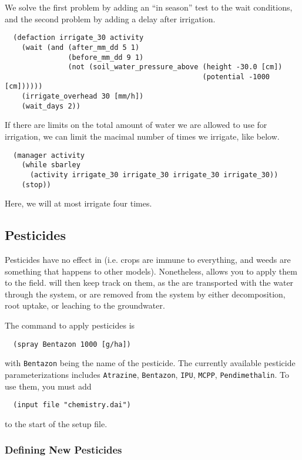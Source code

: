 \documentclass[a4paper,11pt]{article}
\begin{document}
We solve the first problem by adding an ``in season'' test to the wait
conditions, and the second problem by adding a delay after
irrigation. 
\begin{verbatim}
  (defaction irrigate_30 activity 
    (wait (and (after_mm_dd 5 1)
               (before_mm_dd 9 1)
               (not (soil_water_pressure_above (height -30.0 [cm])
                                               (potential -1000 [cm])))))
    (irrigate_overhead 30 [mm/h])
    (wait_days 2))
\end{verbatim}

If there are limits on the total amount of water we are allowed to use
for irrigation, we can limit the macimal number of times we irrigate,
like below.
\begin{verbatim}
  (manager activity
    (while sbarley
      (activity irrigate_30 irrigate_30 irrigate_30 irrigate_30))
    (stop))
\end{verbatim}
Here, we will at most irrigate four times.

\subsection{Pesticides}
\label{sec:pesticides}

Pesticides have no effect in \daisy{} (i.e. \daisy{} crops are immune
to everything, and weeds are something that happens to other models).
Nonetheless, \daisy{} allows you to apply them to the field.  \Daisy{}
will then keep track on them, as the are transported with the water
through the system, or are removed from the system by either
decomposition, root uptake, or leaching to the groundwater.

The command to apply pesticides is
\begin{verbatim}
  (spray Bentazon 1000 [g/ha])
\end{verbatim}
with \texttt{Bentazon} being the name of the pesticide.  The currently
available pesticide parameterizations includes \texttt{Atrazine},
\texttt{Bentazon}, \texttt{IPU}, \texttt{MCPP},
\texttt{Pendimethalin}.  To use them, you must add
\begin{verbatim}
  (input file "chemistry.dai")
\end{verbatim}
to the start of the setup file.

\subsubsection{Defining New Pesticides}
\end{document}
